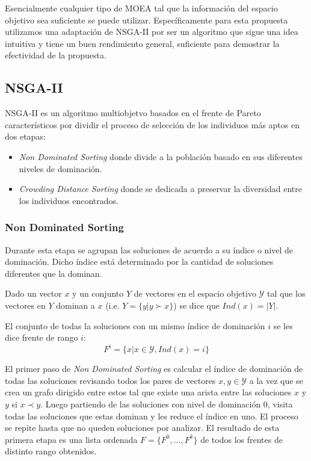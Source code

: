 Esencialmente cualquier tipo de MOEA tal que la informaci\'on del espacio objetivo sea suficiente se puede utilizar. Espec\'ificamente para esta propuesta utilizamos una adaptaci\'on de NSGA-II  por ser un algoritmo que sigue una idea intuitiva y tiene un buen rendimiento general, suficiente para demostrar la efectividad de la propuesta.

\subsection{NSGA-II}
NSGA-II  es un algoritmo multiobjetvo basados en el frente de Pareto caracter\'isticos por dividir el proceso de selecci\'on de los individuos m\'as aptos en dos etapas:
\begin{itemize}
    \item \textit{Non Dominated Sorting} donde divide a la poblaci\'on basado en sus diferentes niveles de dominaci\'on.
    \item \textit{Crowding Distance Sorting} donde se dedicada a preservar la diversidad entre los individuos encontrados. 
\end{itemize}


\subsubsection{Non Dominated Sorting}
Durante esta etapa se agrupan las soluciones de acuerdo a su \'indice o nivel de dominaci\'on. Dicho \'indice est\'a  determinado por la cantidad de soluciones diferentes que la dominan.

\begin{definition}
    \label{proposal:def:domination_index}
    Dado un vector $x$ y un conjunto $Y$ de vectores en el espacio objetivo $\mathcal{Y}$ tal que los vectores en $Y$ dominan a $x$ (i.e. $Y = \{y | y \succ x\}$) se dice que $Ind(x) = |Y|$.
\end{definition}

\begin{definition}
    \label{proposal:def:rank_front}
    El conjunto de todas la soluciones con un mismo \'indice de dominaci\'on $i$ se les dice frente de rango $i$:
    \begin{equation*}
         F^i = \{x | x \in \mathcal{Y}, Ind(x) = i\}
    \end{equation*}
\end{definition}

El primer paso de \textit{Non Dominated Sorting} es calcular el \'indice de dominaci\'on de todas las soluciones revisando todos los pares de vectores $x, y \in \mathcal{Y}$ a la vez que se crea un grafo dirigido entre estos tal que existe una arista entre las soluciones $x$ y $y$ si $x \prec y$. Luego partiendo de las soluciones con nivel de dominaci\'on 0, visita todas las soluciones que estas dominan y les reduce el \'indice en uno. El proceso se repite hasta que no queden soluciones por analizar.
El resultado de esta primera etapa es una lista ordenada  $F = \{F^0, ..., F^k\}$ de todos los frentes de distinto rango obtenidos. 

